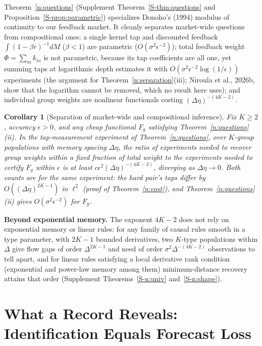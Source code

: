 \documentclass[11pt,letterpaper]{article}
\newtheorem{corollary}[theorem]{Corollary}
\theoremstyle{definition}
\begin{document}
Theorem~\ref{n:questions} (Supplement Theorem~\ref{S-thm:questions} and Proposition~\ref{S-prop:parametric}) specializes Donoho's (1994) modulus of continuity to our feedback market. It cleanly separates market-wide questions from compositional ones: a single kernel tap and discounted feedback $\int (1 - \beta r)^{-1} dM$ ($\beta < 1$) are parametric ($O(\sigma^2 \epsilon^{-2})$); total feedback weight $\Phi = \sum_m k_m$ is not parametric, because its tap coefficients are all one, yet summing taps at logarithmic depth estimates it with $O(\sigma^2 \epsilon^{-2} \log(1/\epsilon))$ experiments (the argument for Theorem~\ref{n:separation}(iii); Niroula et al., 2026b, show that the logarithm cannot be removed, which no result here uses); and individual group weights are nonlinear functionals costing $(\Delta\eta)^{-(4K-2)}$.

\begin{corollary}[Separation of market-wide and compositional inference]\label{n:sep}
Fix $K \ge 2$, accuracy $\epsilon > 0$, and any cheap functional $F_g$ satisfying Theorem~\ref{n:questions}(ii). In the tap-measurement experiment of Theorem~\ref{n:questions}, over $K$-group populations with memory spacing $\Delta\eta$, the ratio of experiments needed to recover group weights within a fixed fraction of total weight to the experiments needed to certify $F_g$ within $\epsilon$ is at least $c \epsilon^2 (\Delta\eta)^{-(4K-2)}$, diverging as $\Delta\eta \to 0$. Both counts are for the same experiment: the hard pair's taps differ by $O((\Delta\eta)^{2K-1})$ in $\ell^2$ (proof of Theorem~\ref{n:cost}), and Theorem~\ref{n:questions}(ii) gives $O(\sigma^2\epsilon^{-2})$ for $F_g$.
\end{corollary}


\textbf{Beyond exponential memory.} The exponent $4K-2$ does not rely on exponential memory or linear rules: for any family of causal rules smooth in a type parameter, with $2K-1$ bounded derivatives, two $K$-type populations within $\Delta$ give flow gaps of order $\Delta^{2K-1}$ and need of order $\sigma^2\Delta^{-(4K-2)}$ observations to tell apart, and for linear rules satisfying a local derivative rank condition (exponential and power-law memory among them) minimum-distance recovery attains that order (Supplement Theorems~\ref{S-n:univ} and~\ref{S-n:shape}).

\section{What a Record Reveals: Identification Equals Forecast Loss}\label{n:irr_sec}
\end{document}
